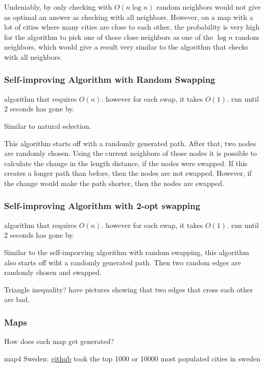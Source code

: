 \documentclass{article}
\begin{document}
\noindent
Undeniably, by only checking with $O(n\log{n})$ random neighbors would not give as optimal an answer as checking with all neighbors. However, on a map with a lot of cities where many cities are close to each other, the probability is very high for the algorithm to pick one of those close neighbors as one of the $\log{n}$ random neighbors, which would give a result very similar to the algorithm that checks with all neighbors.





\subsubsection{Self-improving Algorithm with Random Swapping}\label{Random Swapping}
algorithm that requires $O(n)$. however for each swap, it takes $O(1)$. run until 2 seconds has gone by.

Similar to natural selection.

This algorithm starts off with a randomly generated path. After that, two nodes are randomly chosen. Using the current neighbors of those nodes it is possible to calculate the change in the length distance, if the nodes were swapped. If this creates a longer path than before, then the nodes are not swapped. However, if the change would make the path shorter, then the nodes are swapped.



\subsubsection{Self-improving Algorithm with 2-opt swapping}\label{2-opt swapping}
algorithm that requires $O(n)$. however for each swap, it takes $O(1)$. run until 2 seconds has gone by.

Similar to the self-imporving algorithm with random swapping, this algorithm also starts off wiht a randomly generated path. Then two random edges are randomly chosen and swapped. 

Triangle inequality?
have pictures showing that two edges that cross each other are bad.

\subsubsection{Maps}\label{maps}
How does each map get generated?

map4 Sweden: \href{https://github.com/sphrak/svenska-stader/blob/master/src/svenska-stader.csv}{github}  took the top 1000 or 10000 most populated cities in sweden
\end{document}
